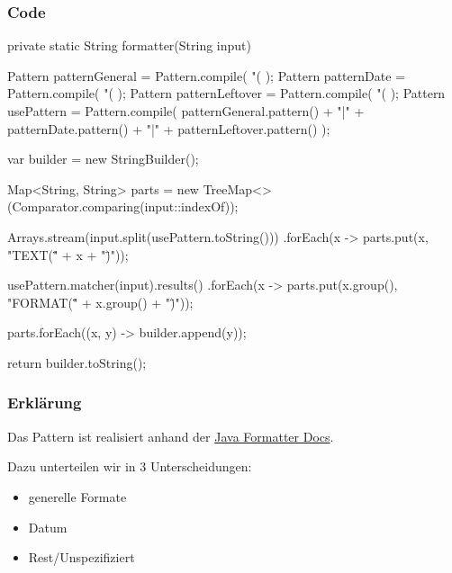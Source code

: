 \subsubsection{Code}
\begin{code}[language=java, caption={Funktion für Java Formatter}, label={lst:Aufgabe1a}]
private static String formatter(String input) {
    Pattern patternGeneral =
            Pattern.compile(
                    "(%
            );
    Pattern patternDate =
            Pattern.compile(
                    "(%
            );
    Pattern patternLeftover =
            Pattern.compile(
                    "(%
            );
    Pattern usePattern = Pattern.compile(
            patternGeneral.pattern()
                    + "|" + patternDate.pattern()
                    + "|" + patternLeftover.pattern()
    );

    var builder = new StringBuilder();

    Map<String, String> parts = new TreeMap<>(Comparator.comparing(input::indexOf));

    Arrays.stream(input.split(usePattern.toString()))
            .forEach(x -> parts.put(x, "TEXT(\"" + x + "\")"));

    usePattern.matcher(input).results()
            .forEach(x -> parts.put(x.group(), "FORMAT(\"" + x.group() + "\")"));

    parts.forEach((x, y) -> builder.append(y));

    return builder.toString();
}
\end{code}

\subsubsection{Erklärung}
Das Pattern ist realisiert anhand der \href{https://docs.oracle.com/javase/7/docs/api/java/util/Formatter.html}{Java Formatter Docs}. \newline

Dazu unterteilen wir in 3 Unterscheidungen:
\begin{itemize}
	\item generelle Formate
  \item Datum
  \item Rest/Unspezifiziert
\end{itemize}

